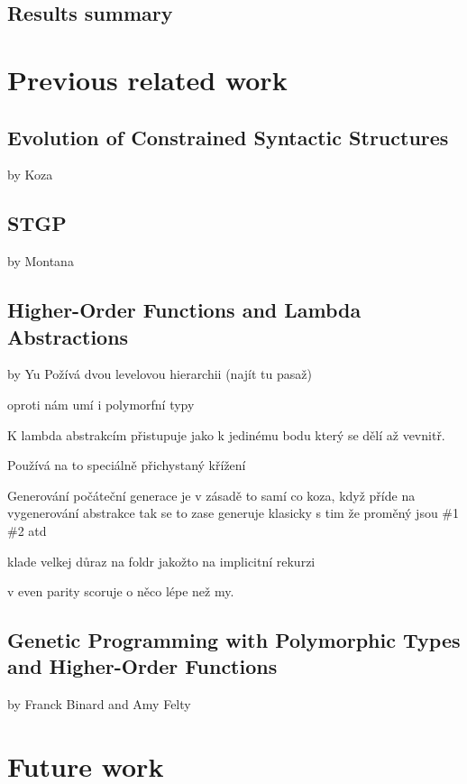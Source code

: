 \documentclass[12pt,a4paper]{report}
\begin{document}
\section{Results summary}


		
\chapter{Previous related work}

\section{Evolution of Constrained Syntactic Structures }
by Koza

\section{STGP}
by Montana

\section{Higher-Order Functions and Lambda Abstractions} 
by Yu
Požívá dvou levelovou hierarchii (najít tu pasaž)

oproti nám umí i polymorfní typy

K  lambda abstrakcím přistupuje jako k jedinému bodu který se dělí až 
vevnitř.

Používá na to speciálně přichystaný křížení

Generování počáteční generace je v zásadě to samí co koza, když příde na vygenerování 
abstrakce tak se to zase generuje klasicky s tim že proměný jsou \#1 \#2 atd

klade velkej důraz na foldr jakožto na implicitní rekurzi

v even parity scoruje o něco lépe než my.

\section{Genetic Programming with Polymorphic Types and Higher-Order Functions}
by Franck Binard and Amy Felty

\chapter{Future work}
\end{document}
